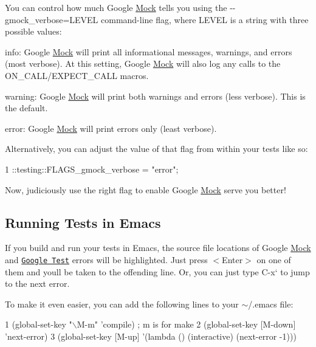You can control how much Google \hyperlink{class_mock}{Mock} tells you using the {\ttfamily -\/-\/gmock\+\_\+verbose=L\+E\+V\+EL} command-\/line flag, where {\ttfamily L\+E\+V\+EL} is a string with three possible values\+:


\begin{DoxyItemize}
\item {\ttfamily info}\+: Google \hyperlink{class_mock}{Mock} will print all informational messages, warnings, and errors (most verbose). At this setting, Google \hyperlink{class_mock}{Mock} will also log any calls to the {\ttfamily O\+N\+\_\+\+C\+A\+L\+L/\+E\+X\+P\+E\+C\+T\+\_\+\+C\+A\+LL} macros.
\item {\ttfamily warning}\+: Google \hyperlink{class_mock}{Mock} will print both warnings and errors (less verbose). This is the default.
\item {\ttfamily error}\+: Google \hyperlink{class_mock}{Mock} will print errors only (least verbose).
\end{DoxyItemize}

Alternatively, you can adjust the value of that flag from within your tests like so\+:


\begin{DoxyCode}
1 ::testing::FLAGS\_gmock\_verbose = "error";
\end{DoxyCode}


Now, judiciously use the right flag to enable Google \hyperlink{class_mock}{Mock} serve you better!

\subsection*{Running Tests in Emacs}

If you build and run your tests in Emacs, the source file locations of Google \hyperlink{class_mock}{Mock} and \href{http://code.google.com/p/googletest/}{\tt Google Test} errors will be highlighted. Just press {\ttfamily $<$Enter$>$} on one of them and you\textquotesingle{}ll be taken to the offending line. Or, you can just type {\ttfamily C-\/x}` to jump to the next error.

To make it even easier, you can add the following lines to your {\ttfamily $\sim$/.emacs} file\+:


\begin{DoxyCode}
1 (global-set-key "\(\backslash\)M-m"   'compile)  ; m is for make
2 (global-set-key [M-down] 'next-error)
3 (global-set-key [M-up]   '(lambda () (interactive) (next-error -1)))
\end{DoxyCode}



